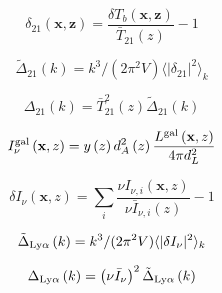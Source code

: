 
\begin{equation}
  \delta_{21}\left(\textbf{x}, \textbf{z} \right) = \frac{\delta T_{b}\left(\textbf{x}, \textbf{z} \right)}{\bar{T}_{21}(z)} - 1
\end{equation}

\begin{equation}
  \tilde{\Delta}_{21} \left( k \right) = k^3 / (2 \pi^2 V) \langle | \delta_{21} |^2 \rangle_k
\end{equation}

\begin{equation}
  \Delta_{21} \left( k \right) = \bar{T}_{21}^2(z)\tilde{\Delta}_{21} \left( k \right)
\end{equation}

\begin{equation}
  I_{\nu}^{\rm gal}\left(\textbf{x}, z \right) = y \left(z \right)d_A^2 \left(z \right) \frac{L^{\rm gal} \left(\textbf{x}, z \right)}{4 \pi d_L^2}
\end{equation}

\begin{equation}
  \delta I_{\nu} \left(\textbf{x}, z \right) = \sum_i \frac{\nu I_{\nu, i} \left(\textbf{x}, z \right)}{\nu \bar{I}_{\nu, i} \left(z \right)} - 1
\end{equation}

\begin{equation}
  \tilde{\Delta}_{\rm Ly\alpha} \left( k \right) = k^3 / (2 \pi^2 V) \langle | \delta I_{\nu} |^2 \rangle_k
\end{equation}

\begin{equation}
  \Delta_{\rm Ly\alpha} \left( k \right) = \left(\nu \bar{I}_{\nu} \right)^2\tilde{\Delta}_{\rm Ly\alpha} \left( k \right)
\end{equation}
